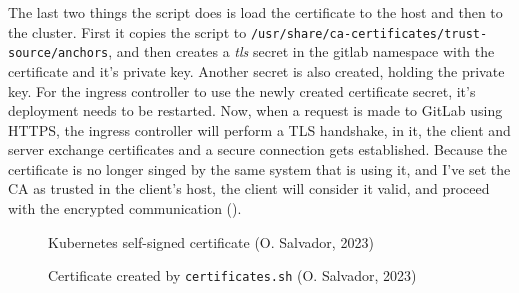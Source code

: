 \documentclass[11pt]{article}
\begin{document}
\begin{flushleft}
The last two things the script does is load the certificate to the host and then to the cluster. First it copies the script to \texttt{/usr/share/ca-certificates/trust-source/anchors}, and then creates a \textit{\acrshort{tls}} secret in the gitlab namespace with the certificate and it's private key. Another secret is also created, holding the private key. For the ingress controller to use the newly created certificate secret, it's deployment needs to be restarted. Now, when a request is made to GitLab using HTTPS, the ingress controller will perform a TLS handshake, in it, the client and server exchange certificates and a secure connection gets established. Because the certificate is no longer singed by the same system that is using it, and I've set the CA as trusted in the client's host, the client will consider it valid, and proceed with the encrypted communication (\cite{badawy}).
\linebreak


    \begin{figure}[htb]
		\centering
		\caption{Kubernetes self-signed certificate (O. Salvador, 2023)}
	\end{figure}

    \bigskip
    
    \begin{figure}[htb]
		\centering
		\caption{Certificate created by \texttt{certificates.sh} (O. Salvador, 2023)}
	\end{figure}


\end{flushleft}
\end{document}
